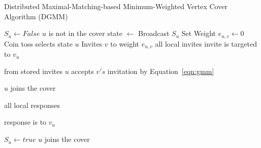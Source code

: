 \begin{algorithm}
\caption{Distributed Maximal-Matching-based Minimum-Weighted Vertex Cover  Algorithm (DGMM)}
\begin{algorithmic}[1]
\State $S_u \leftarrow False$ \Comment $u$ is not in the cover
\State state $\leftarrow$ \cCd
\Repeat
\State Broadcast $S_u$
\State Set Weight $e_{u,v} \leftarrow 0$ \label{alglin:dgmm-state-E}
\EndIf
{}
 \Comment Coin toss selects state
\label{alglin:dgmm-issue-invite}
 \Comment $u$ Invites $v$ to weight $e_{u,v}$ \label{alglin:dgmm-invite}
 \Comment all local invites
 \Comment invite is targeted to $v_u$
\EndIf
{}

 \Comment from stored invites \label{alglin:dgmm-choose-invite}
 \Comment $u$ accepts $v's$ invitation
 \Comment by Equation~\ref{eqn:gmm} \label{alglin:dgmm-update-weight-R}

\label{alglin:dgmm-join-cover-R}
 \Comment $u$ joins the cover
\Else 
{}
\EndIf

 \Comment all local responses

 \Comment response is to $v_u$
\label{alglin:dgmm-update-weight-W}

\label{alglin:dgmm-join-cover-W}
\State $S_u \leftarrow true$ \Comment $u$ joins the cover
\label{alglin:dgmm-state-E-W}
\Else 
{}
\EndIf

\EndIf

\EndIf

\label{alglin:dgmm-end-while}
\EndFor
\end{algorithmic}
\label{alg:dgmm}
\end{algorithm}
